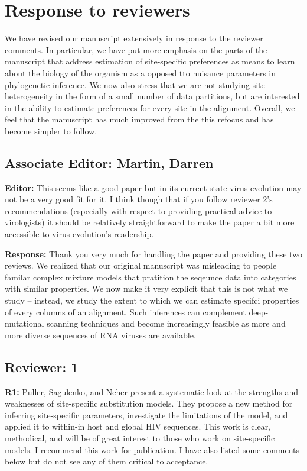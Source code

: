 \documentclass[aps,rmp,onecolumn]{revtex4-1}
\newcommand{\refa}[1]{\textbf{R1:} #1}
\newcommand{\editor}[1]{\textbf{Editor:} #1}
\newcommand{\response}[1]{{\color{black}\textbf{Response:} #1}}
\begin{document}
\section*{Response to reviewers}

We have revised our manuscript extensively in response to the reviewer comments.
In particular, we have put more emphasis on the parts of the manuscript that address estimation of site-specific preferences as means to learn about the biology of the organism as a opposed tto nuisance parameters in phylogenetic inference.
We now also stress that we are not studying site-heterogeneity in the form of a small number of data partitions, but are interested in the ability to estimate preferences for every site in the alignment.
Overall, we feel that the manuscript has much improved from the this refocus and has become simpler to follow.


\subsection*{Associate Editor: Martin, Darren}

\editor{This seems like a good paper but in its current state virus evolution may not be a very good fit for it.  I think though that if you follow reviewer 2's recommendations (especially with respect to providing practical advice to virologists) it should be relatively straightforward to make the paper a bit more accessible to virus evolution's readership.}

\response{
Thank you very much for handling the paper and providing these two reviews.
We realized that our original manuscript was misleading to people familar complex mixture models that pratition the seqeunce data into categories with similar properties.
We now make it very explicit that this is not what we study -- instead, we study the extent to which we can estimate specifci properties of every columns of an alignment.
Such inferences can complement deep-mutational scanning techniques and become increasingly feasible as more and more diverse sequences of RNA viruses are available.

}


\subsection*{Reviewer: 1}

\refa{Puller, Sagulenko, and Neher present a systematic look at the strengths and weaknesses of site-specific substitution models. They propose a new method for inferring site-specific parameters, investigate the limitations of the model, and applied it to within-in host and global HIV sequences. This work is clear, methodical, and will be of great interest to those who work on site-specific models. I recommend this work for publication. I have also listed some comments below but do not see any of them critical to acceptance.}
\end{document}
